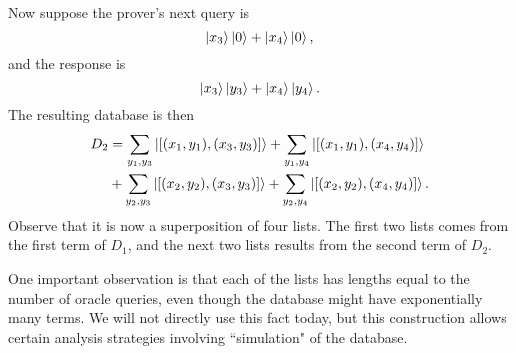 Now suppose the prover's next query is 
$$\ket{x_3}\ket{0}+\ket{x_4}\ket{0},$$
and the response is
$$\ket{x_3}\ket{y_3}+\ket{x_4}\ket{y_4}.$$
The resulting database is then
\begin{align*}
	D_2&=
	\sum_{y_1, y_3}\ket{[(x_1, y_1), (x_3, y_3)]}
	+ \sum_{y_1, y_4}\ket{[(x_1, y_1), (x_4, y_4)]}\\
	&+ \sum_{y_2, y_3}\ket{[(x_2, y_2), (x_3, y_3)]}
	+ \sum_{y_2, y_4}\ket{[(x_2, y_2), (x_4, y_4)]}.
\end{align*}
Observe that it is now a superposition of four lists.
The first two lists comes from the first term of $D_1$,
and the next two lists results from the second term of $D_2$.

One important observation is that each of the lists has lengths equal to the number of oracle queries,
even though the database might have exponentially many terms.
We will not directly use this fact today,
but this construction allows certain analysis strategies involving ``simulation" of the database.
